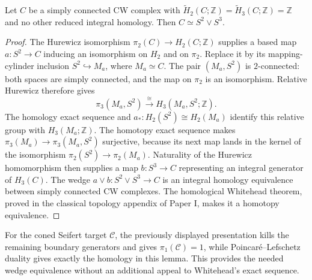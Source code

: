 \begin{lemma}
\label{mapsIII:carrier-three-complex-wedge}
Let $C$ be a simply connected CW complex with
$\widetilde H_2(C;\mathbb Z)=\widetilde H_3(C;\mathbb Z)=\mathbb Z$
and no other reduced integral homology. Then
$C\simeq S^2\vee S^3$.
\end{lemma}

\begin{proof}
The Hurewicz isomorphism $\pi_2(C)\to H_2(C;\mathbb Z)$ supplies a
based map $a:S^2\to C$ inducing an isomorphism on $H_2$ and on
$\pi_2$. Replace it by its mapping-cylinder inclusion
$S^2\hookrightarrow M_a$, where $M_a\simeq C$.
The pair $(M_a,S^2)$ is $2$-connected: both spaces are simply
connected, and the map on $\pi_2$ is an isomorphism.
Relative Hurewicz therefore gives
\[
 \pi_3(M_a,S^2)\xrightarrow{\ \cong\ }
 H_3(M_a,S^2;\mathbb Z).
\]
The homology exact sequence and $a_*:H_2(S^2)\cong H_2(M_a)$
identify this relative group with $H_3(M_a;\mathbb Z)$.
The homotopy exact sequence makes
$\pi_3(M_a)\to\pi_3(M_a,S^2)$ surjective, because its next map
lands in the kernel of the isomorphism
$\pi_2(S^2)\to\pi_2(M_a)$.
Naturality of the Hurewicz homomorphism then supplies a map
$b:S^3\to C$ representing an integral generator of $H_3(C)$.
The wedge $a\vee b:S^2\vee S^3\to C$ is an integral homology
equivalence between simply connected CW complexes. The homological
Whitehead theorem, proved in the classical topology appendix of Paper I,
makes it a homotopy equivalence.
\end{proof}

For the coned Seifert target $\mathcal C$, the previously displayed
presentation kills the remaining boundary generators and gives
$\pi_1(\mathcal C)=1$, while Poincaré--Lefschetz duality gives exactly
the homology in this lemma. This provides the needed wedge equivalence
without an additional appeal to Whitehead's exact sequence.
